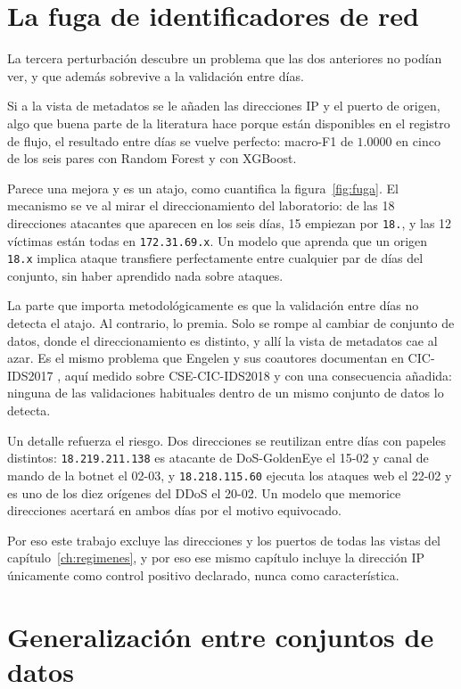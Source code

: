 \section{La fuga de identificadores de red}
\label{sec:fuga}

La tercera perturbación descubre un problema que las dos anteriores no podían
ver, y que además sobrevive a la validación entre días.

Si a la vista de metadatos se le añaden las direcciones IP y el puerto de
origen, algo que buena parte de la literatura hace porque están disponibles en el
registro de flujo, el resultado entre días se vuelve perfecto: macro-F1 de
$1.0000$ en cinco de los seis pares con Random Forest y con XGBoost.

Parece una mejora y es un atajo, como cuantifica la figura~\ref{fig:fuga}. El
mecanismo se ve al mirar el direccionamiento del laboratorio: de las 18
direcciones atacantes que aparecen en los seis días, 15 empiezan por
\texttt{18.}, y las 12 víctimas están todas en \texttt{172.31.69.x}. Un modelo
que aprenda que un origen \texttt{18.x} implica ataque transfiere perfectamente
entre cualquier par de días del conjunto, sin haber aprendido nada sobre
ataques.

La parte que importa metodológicamente es que la validación entre días no
detecta el atajo. Al contrario, lo premia. Solo se rompe al cambiar de conjunto
de datos, donde el direccionamiento es distinto, y allí la vista de metadatos
cae al azar. Es el mismo problema que Engelen y sus coautores documentan en
CIC-IDS2017 \cite{Engelen2021}, aquí medido sobre CSE-CIC-IDS2018 y con una
consecuencia añadida: ninguna de las validaciones habituales dentro de un mismo
conjunto de datos lo detecta.

Un detalle refuerza el riesgo. Dos direcciones se reutilizan entre días con
papeles distintos: \texttt{18.219.211.138} es atacante de DoS-GoldenEye el 15-02
y canal de mando de la botnet el 02-03, y \texttt{18.218.115.60} ejecuta los
ataques web el 22-02 y es uno de los diez orígenes del DDoS el 20-02. Un modelo
que memorice direcciones acertará en ambos días por el motivo equivocado.

Por eso este trabajo excluye las direcciones y los puertos de todas las vistas
del capítulo~\ref{ch:regimenes}, y por eso ese mismo capítulo incluye la
dirección IP únicamente como control positivo declarado, nunca como
característica.

\section{Generalización entre conjuntos de datos}
\label{sec:cross-dataset}

